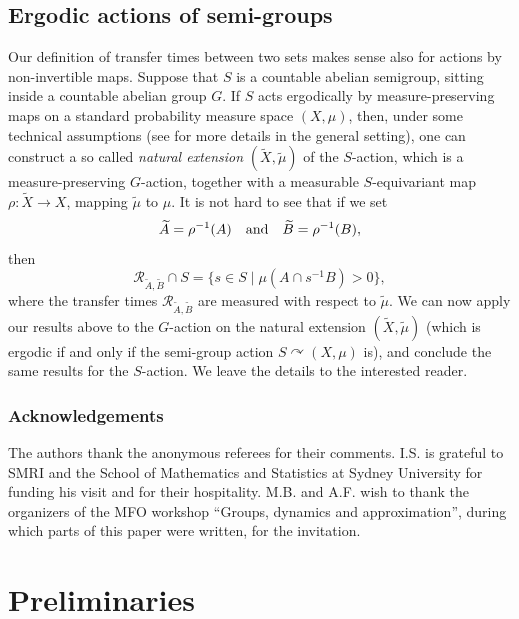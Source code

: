 \documentclass[10pt]{amsart}
\let\mathcal\mathscr
\newcommand{\cR}{\mathcal{R}}
\newcommand{\qand}{\quad\textup{and}\quad}
\let\acts\curvearrowright
\theoremstyle{plain}
\theoremstyle{definition}
\begin{document}
\subsection{Ergodic actions of semi-groups}

Our definition of transfer times between two sets makes sense also for actions by non-invertible maps. Suppose that $S$ is a countable
abelian semigroup, sitting inside a countable abelian group $G$. If $S$ acts ergodically by measure-preserving maps on a standard
probability measure space $(X,\mu)$, then, under some technical assumptions (see \eg \cite{La} for more details in the general setting), one can construct a
so called \emph{natural extension} $(\widetilde{X},\widetilde{\mu})$ of the $S$-action, which is a measure-preserving $G$-action, together with
a measurable $S$-equivariant map $\rho : \widetilde{X} \to X$, mapping $\widetilde{\mu}$ to $\mu$. It is not hard to see that if we
set
\[
\widetilde{A} = \rho^{-1}(A) \qand \widetilde{B} = \rho^{-1}(B),
\]
then
\[
\cR_{\widetilde{A},\widetilde{B}} \cap S = \bigl\{ s \in S \mid  \mu(A \cap s^{-1}B) > 0 \bigr\},
\]
where the transfer times $\cR_{\widetilde{A},\widetilde{B}}$ are measured with respect to $\tilde{\mu}$. We can now apply our results above
to the $G$-action on the natural extension $(\widetilde{X},\widetilde{\mu})$ (which is ergodic if and only if the semi-group action $S \acts (X,\mu)$ is), and conclude the same results for the
$S$-action. We leave the details to the interested reader.

\subsubsection*{Acknowledgements}
The authors thank the anonymous referees for their comments. I.S. is grateful to SMRI and the School of Mathematics and Statistics at Sydney University for funding his visit and for their hospitality.
M.B. and A.F. wish to thank the organizers of the MFO workshop ``Groups, dynamics and approximation'', during which parts of this paper
were written, for the invitation.

\section{Preliminaries}
\end{document}
